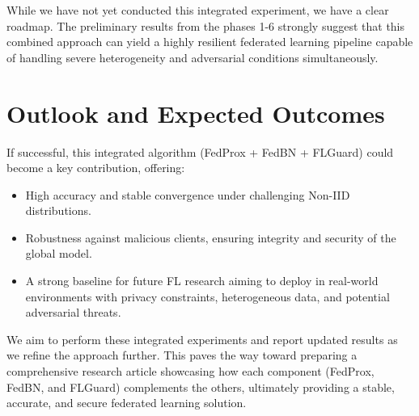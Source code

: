 \documentclass[12pt,a4paper]{report}
\begin{document}
While we have not yet conducted this integrated experiment, we have a clear roadmap. The preliminary results from the phases 1-6 strongly suggest that this combined approach can yield a highly resilient federated learning pipeline capable of handling severe heterogeneity and adversarial conditions simultaneously.

\section{Outlook and Expected Outcomes}

If successful, this integrated algorithm (FedProx + FedBN + FLGuard) could become a key contribution, offering:
\begin{itemize}
	\item High accuracy and stable convergence under challenging Non-IID distributions.
	\item Robustness against malicious clients, ensuring integrity and security of the global model.
	\item A strong baseline for future FL research aiming to deploy in real-world environments with privacy constraints, heterogeneous data, and potential adversarial threats.
\end{itemize}

We aim to perform these integrated experiments and report updated results as we refine the approach further. This paves the way toward preparing a comprehensive research article showcasing how each component (FedProx, FedBN, and FLGuard) complements the others, ultimately providing a stable, accurate, and secure federated learning solution.
\end{document}
